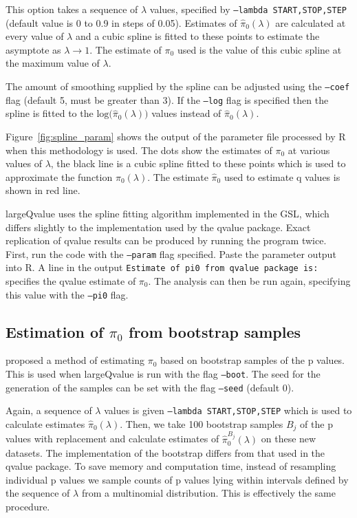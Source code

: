 \documentclass{amsart}
\begin{document}
This option takes a sequence of $\lambda$ values, specified by \texttt{--lambda START,STOP,STEP} (default value is 0 to 0.9 in steps of 0.05). Estimates of $\hat{\pi}_0(\lambda)$ are calculated at every value of $\lambda$ and a cubic spline is fitted to these points to estimate the asymptote as $\lambda\rightarrow1$. The estimate of $\pi_0$ used is the value of this cubic spline at the maximum value of $\lambda$.

The amount of smoothing supplied by the spline can be adjusted using the \texttt{--coef} flag (default 5, must be greater than 3). If the \texttt{--log} flag is specified then the spline is fitted to the $\text{log(}\hat{\pi}_0(\lambda))$ values instead of $\hat{\pi}_0(\lambda)$.

Figure~\ref{fig:spline_param} shows the output of the parameter file processed by R when this methodology is used. The dots show the estimates of $\pi_0$ at various values of $\lambda$, the black line is a cubic spline fitted to these points which is used to approximate the function $\pi_0(\lambda)$. The estimate $\hat{\pi}_0$ used to estimate q values is shown in red line.

largeQvalue uses the spline fitting algorithm implemented in the GSL, which differs slightly to the implementation used by the qvalue package. Exact replication of qvalue results can be produced by running the program twice. First, run the code with the \texttt{--param} flag specified. Paste the parameter output into R. A line in the output \texttt{Estimate of pi0 from qvalue package is:} specifies the qvalue estimate of $\pi_0$. The analysis can then be run again, specifying this value with the \texttt{--pi0} flag.

\subsection{Estimation of $\pi_0$ from bootstrap samples}
\label{sec:boot}
\citet{bootstorey} proposed a method of estimating $\pi_0$ based on bootstrap samples of the p values. This is used when largeQvalue is run with the flag \texttt{--boot}. The seed for the generation of the samples can be set with the flag \texttt{--seed} (default 0).

Again, a sequence of $\lambda$ values is given \texttt{--lambda START,STOP,STEP} which is used to calculate estimates $\hat{\pi}_0(\lambda)$. Then, we take 100 bootstrap samples $B_j$ of the p values with replacement and calculate estimates of  $\hat{\pi}^{B_j}_0(\lambda)$ on these new datasets. The implementation of the bootstrap differs from that used in the qvalue package. To save memory and computation time, instead of resampling individual p values we sample counts of p values lying within intervals defined by the sequence of $\lambda$ from a multinomial distribution. This is effectively the same procedure.
\end{document}
